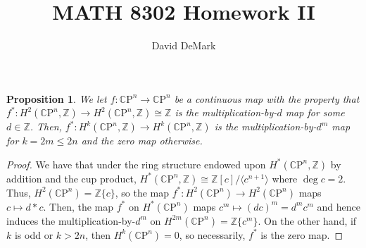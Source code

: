 \documentclass[english]{article}
\title{MATH 8302 Homework II}
\author{David DeMark}
\date{\due}
\newcommand{\CC}{\mathbb{C}}
\newcommand{\ZZ}{\mathbb{Z}}
\newcommand{\prob}[1]{\setcounter{section}{#1-1}\section{}}
\newcommand{\prt}[1]{\setcounter{subsection}{#1-1}\subsection{}}
\newtheorem*{proposition*}{Proposition}
\theoremstyle{remark}
\theoremstyle{definition}
\newcommand{\CP}{{\CC\mathrm{P}}}
\newcommand{\idl}[1]{\langle #1\rangle}
\begin{document}
\maketitle
\prob{1}\prt{1}\begin{proposition*}
	We let $f:\CP^n\to \CP^n$ be a continuous map with the property that $f^*:H^2(\CP^n,\ZZ)\to H^2(\CP^n,\ZZ)\cong \ZZ$ is the multiplication-by-$d$ map for some $d\in \ZZ$. Then, $f^*:H^k(\CP^n,\ZZ)\to H^k(\CP^n,\ZZ)$ is the multiplication-by-$d^m$ map for $k=2m\leq 2n$ and the zero map otherwise.
\end{proposition*}
\begin{proof}
 We have that under the ring structure endowed upon $H^*(\CP^n,\ZZ)$ by addition and the cup product, $H^*(\CP^n,\ZZ)\cong \ZZ[c]/\idl{c^{n+1}}$ where $\deg c=2$. Thus, $H^2(\CP^n)=\ZZ\{c\}$, so the map $f^*:H^2(\CP^n)\to H^2 (\CP^n)$ maps $c\mapsto d*c$. Then, the map $f^*$ on $H^*(\CP^n)$ maps $c^m\mapsto (dc)^m=d^mc^m$ and hence induces the multiplication-by-$d^m$ on $H^{2m}(\CP^n)=\ZZ\{c^m\}$. On the other hand, if $k$ is odd or $k>2n$, then $H^k(\CP^n)=0$, so necessarily, $f^*$ is the zero map.
\end{proof}
\end{document}
